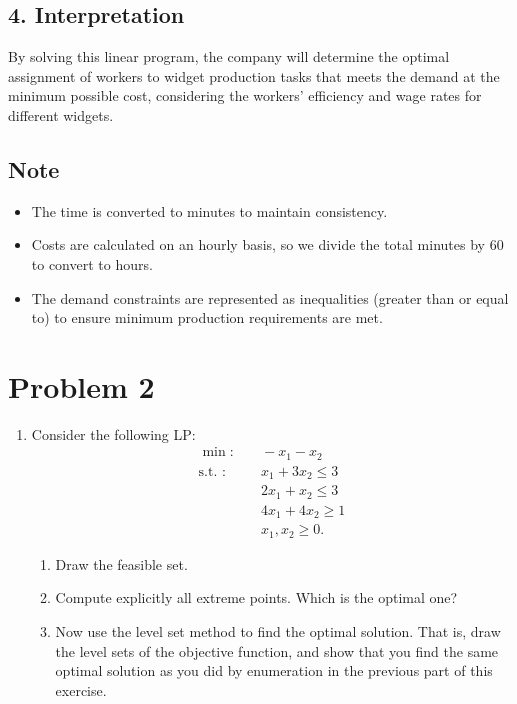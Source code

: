 \documentclass{article}
\begin{document}
\subsection*{4. Interpretation}

By solving this linear program, the company will determine the optimal assignment of workers to widget production tasks that meets the demand at the minimum possible cost, considering the workers' efficiency and wage rates for different widgets.

\subsection*{Note}

\begin{itemize}
    \item The time is converted to minutes to maintain consistency.
    \item Costs are calculated on an hourly basis, so we divide the total minutes by 60 to convert to hours.
    \item The demand constraints are represented as inequalities (greater than or equal to) to ensure minimum production requirements are met.
\end{itemize}

\section*{Problem 2}
\begin{enumerate}
    \item Consider the following LP:
    \begin{align*}
        \min : & \quad -x_1 - x_2 \\
        \text{s.t. : } & \quad x_1 + 3x_2 \leq 3 \\
        & \quad 2x_1 + x_2 \leq 3 \\
        & \quad 4x_1 + 4x_2 \geq 1 \\
        & \quad x_1, x_2 \geq 0.
    \end{align*}
    \begin{enumerate}
        \item Draw the feasible set.
        \item Compute explicitly all extreme points. Which is the optimal one?
        \item Now use the level set method to find the optimal solution. That is, draw the level sets of the objective function, and show that you find the same optimal solution as you did by enumeration in the previous part of this exercise.
    \end{enumerate}
\end{enumerate}
\end{document}
